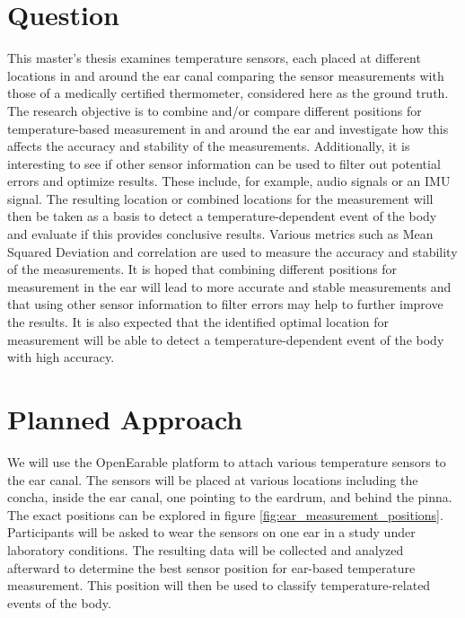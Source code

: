 \section{Question}
This master's thesis examines temperature sensors, each placed at different locations in and around the ear canal comparing the sensor measurements with those of a medically certified thermometer, considered here as the ground truth.
The research objective is to combine and/or compare different positions for temperature-based measurement in and around the ear and investigate how this affects the accuracy and stability of the measurements.
Additionally, it is interesting to see if other sensor information can be used to filter out potential errors and optimize results. These include, for example, audio signals or an IMU signal. The resulting location or combined locations for the measurement will then be taken as a basis to detect a temperature-dependent event of the body and evaluate if this provides conclusive results.
Various metrics such as Mean Squared Deviation and correlation are used to measure the accuracy and stability of the measurements.
It is hoped that combining different positions for measurement in the ear will lead to more accurate and stable measurements and that using other sensor information to filter errors may help to further improve the results. It is also expected that the identified optimal location for measurement will be able to detect a temperature-dependent event of the body with high accuracy.


\section{Planned Approach}
We will use the OpenEarable platform to attach various temperature sensors to the ear canal. 
The sensors will be placed at various locations including the concha, inside the ear canal, one pointing to the eardrum, and behind the pinna.
The exact positions can be explored in figure \ref{fig:ear_measurement_positions}.
Participants will be asked to wear the sensors on one ear in a study under laboratory conditions.
The resulting data will be collected and analyzed afterward to determine the best sensor position for ear-based temperature measurement. 
This position will then be used to classify temperature-related events of the body.

